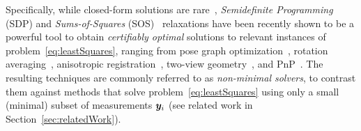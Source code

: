 Specifically, 
while closed-form solutions are rare~\cite{Horn87josa}, 
\emph{Semidefinite Programming} (SDP) and \emph{Sums-of-Squares} (SOS)~\cite{Blekherman12Book-sdpandConvexAlgebraicGeometry}
relaxations have been recently shown to 
  be a powerful tool to obtain \emph{certifiably optimal} solutions to relevant instances of problem~\eqref{eq:leastSquares}, 
  ranging from pose graph optimization~\cite{Carlone16tro-duality2D,Rosen18ijrr-sesync},
   rotation averaging~\cite{Eriksson18cvpr-strongDuality},
   anisotropic registration~\cite{Briales17cvpr-registration}, 
   two-view geometry~\cite{Briales18cvpr-global2view}, 
   and PnP~\cite{Agostinho2019arXiv-cvxpnpl}.
   The resulting techniques are commonly referred to as \emph{non-minimal solvers}, to contrast them against 
   methods that solve problem~\eqref{eq:leastSquares} using only a small (minimal) subset of measurements ${\bm y}_i$ 
   (see related work in Section~\ref{sec:relatedWork}).


